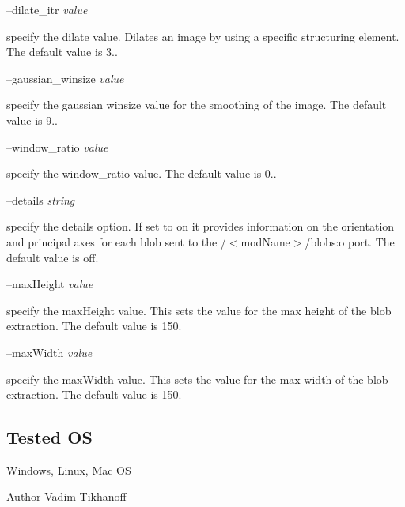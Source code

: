 --dilate\+\_\+itr {\itshape value} 
\begin{DoxyItemize}
\item specify the dilate value. Dilates an image by using a specific structuring element. The default value is 3..
\end{DoxyItemize}

--gaussian\+\_\+winsize {\itshape value} 
\begin{DoxyItemize}
\item specify the gaussian winsize value for the smoothing of the image. The default value is 9..
\end{DoxyItemize}

--window\+\_\+ratio {\itshape value} 
\begin{DoxyItemize}
\item specify the window\+\_\+ratio value. The default value is 0..
\end{DoxyItemize}

--details {\itshape string} 
\begin{DoxyItemize}
\item specify the details option. If set to on it provides information on the orientation and principal axes for each blob sent to the /$<$mod\+Name$>$/blobs\+:o port. The default value is off.
\end{DoxyItemize}

--max\+Height {\itshape value} 
\begin{DoxyItemize}
\item specify the max\+Height value. This sets the value for the max height of the blob extraction. The default value is 150.
\end{DoxyItemize}

--max\+Width {\itshape value} 
\begin{DoxyItemize}
\item specify the max\+Width value. This sets the value for the max width of the blob extraction. The default value is 150.
\end{DoxyItemize}\hypertarget{group__icub__blobExtractor_tested_os_sec}{}\subsection{Tested OS}\label{group__icub__blobExtractor_tested_os_sec}
Windows, Linux, Mac OS

\begin{DoxyAuthor}{Author}
Vadim Tikhanoff 
\end{DoxyAuthor}
